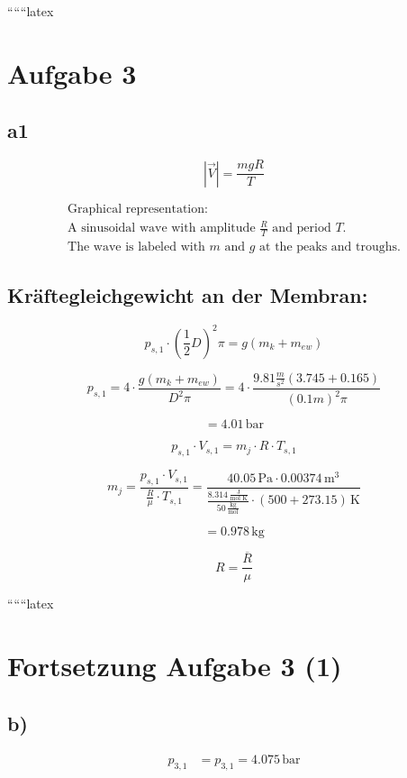 
``````latex


\section*{Aufgabe 3}

\subsection*{a1}

\[
\left| \vec{V} \right| = \frac{m g R}{T}
\]

\[
\begin{array}{c}
\text{Graphical representation:} \\
\text{A sinusoidal wave with amplitude } \frac{R}{T} \text{ and period } T. \\
\text{The wave is labeled with } m \text{ and } g \text{ at the peaks and troughs.}
\end{array}
\]

\subsection*{Kräftegleichgewicht an der Membran:}

\[
p_{s,1} \cdot \left( \frac{1}{2} D \right)^2 \pi = g \left( m_k + m_{ew} \right)
\]

\[
p_{s,1} = 4 \cdot \frac{g \left( m_k + m_{ew} \right)}{D^2 \pi} = 4 \cdot \frac{9.81 \frac{m}{s^2} \left( 3.745 + 0.165 \right)}{(0.1 m)^2 \pi}
\]

\[
= 4.01 \, \text{bar}
\]

\[
p_{s,1} \cdot V_{s,1} = m_j \cdot R \cdot T_{s,1}
\]

\[
m_j = \frac{p_{s,1} \cdot V_{s,1}}{\frac{R}{\mu} \cdot T_{s,1}} = \frac{40.05 \, \text{Pa} \cdot 0.00374 \, \text{m}^3}{\frac{8.314 \, \frac{\text{J}}{\text{mol K}}}{50 \, \frac{\text{kg}}{\text{mol}}} \cdot (500 + 273.15) \, \text{K}}
\]

\[
= 0.978 \, \text{kg}
\]

\[
R = \frac{\overline{R}}{\mu}
\]

``````latex


\section*{Fortsetzung Aufgabe 3 (1)}

\subsection*{b)}
\begin{align*}
    p_{3,1} &= p_{3,1} = 4.075 \, \text{bar}
\end{align*}

